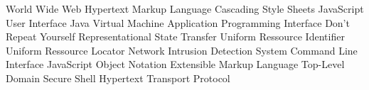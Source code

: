 \begin{acronym}[HTML]
			{World Wide Web}
			{Hypertext Markup Language}
			{Cascading Style Sheets}
			{JavaScript}
			{User Interface}
			{Java Virtual Machine}
   			{Application Programming Interface}
	      {Don't Repeat Yourself}
	     {Representational State Transfer}
	      {Uniform Ressource Identifier}
	      {Uniform Ressource Locator}
	     {Network Intrusion Detection System}
	      {Command Line Interface}
	     {JavaScript Object Notation}
	      {Extensible Markup Language}
			{Top-Level Domain}
			{Secure Shell}
			{Hypertext Transport Protocol}
\end{acronym}
